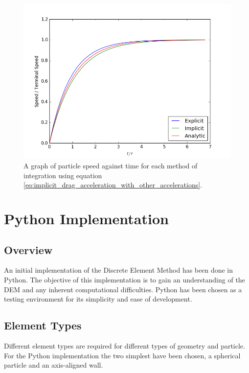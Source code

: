 \documentclass[10pt,a4paper,titlepage]{report}
\begin{document}
\begin{figure}[!htb]
\centering
\includegraphics[scale=0.75]{figures/TerminalVelocityImplicitExplicit.png}
\caption{A graph of particle speed against time for each method of integration using equation \ref{eq:implicit_drag_acceleration_with_other_accelerations}.}
\label{fig:fig:terminal_velocity_implicit_explicit}
\end{figure}
\chapter{Python Implementation}
\section{Overview}
An initial implementation of the Discrete Element Method has been done in Python. The objective of this implementation is to gain an understanding of the DEM and any inherent computational difficulties. Python has been chosen as a testing environment for its simplicity and ease of development. 
\section{Element Types}
Different element types are required for different types of geometry and particle. For the Python implementation the two simplest have been chosen, a spherical particle and an axis-aligned wall.
\end{document}
